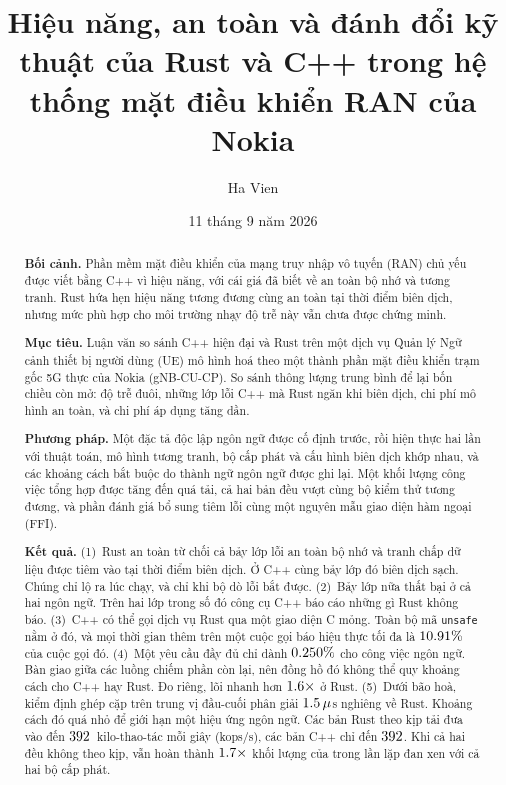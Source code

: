 \documentclass[english,oneside,a4paper,censored,csm,software-track-2020]{HYthesisML}
\title{Hiệu năng, an toàn và đánh đổi kỹ thuật của Rust và C++ trong hệ thống mặt điều khiển RAN của Nokia}
\author{Ha Vien}
\date{11 tháng 9 năm 2026}
\begin{document}
\maketitle

{\singlespacing
\begin{otherlanguage}{english}
\begin{abstract}
      \noindent\textbf{Bối cảnh.}
      Phần mềm mặt điều khiển của mạng truy nhập vô tuyến (RAN) chủ yếu được viết bằng C++ vì hiệu
      năng, với cái giá đã biết về an toàn bộ nhớ và tương tranh. Rust hứa hẹn hiệu năng tương đương
      cùng an toàn tại thời điểm biên dịch, nhưng mức phù hợp cho môi trường nhạy độ trễ này vẫn chưa
      được chứng minh.

      \noindent\textbf{Mục tiêu.}
      Luận văn so sánh C++ hiện đại và Rust trên một dịch vụ Quản lý Ngữ cảnh thiết bị người dùng (UE)
      mô hình hoá theo một thành phần mặt điều khiển trạm gốc 5G thực của Nokia (gNB-CU-CP).
      So sánh thông lượng trung bình để lại bốn chiều còn mở: độ trễ đuôi, những lớp lỗi C++ mà Rust
      ngăn khi biên dịch, chi phí mô hình an toàn, và chi phí áp dụng tăng dần.

      \noindent\textbf{Phương pháp.}
      Một đặc tả độc lập ngôn ngữ được cố định trước, rồi hiện thực hai lần với thuật toán, mô hình
      tương tranh, bộ cấp phát và cấu hình biên dịch khớp nhau, và các khoảng cách bắt buộc do thành
      ngữ ngôn ngữ được ghi lại. Một khối lượng công việc tổng hợp được tăng đến quá tải, cả hai bản
      đều vượt cùng bộ kiểm thử tương đương, và phần đánh giá bổ sung tiêm lỗi cùng một nguyên mẫu
      giao diện hàm ngoại (FFI).

      \noindent\textbf{Kết quả.}
      (1)~Rust an toàn từ chối cả bảy lớp lỗi an toàn bộ nhớ và tranh chấp dữ liệu được tiêm vào tại
      thời điểm biên dịch. Ở C++ cùng bảy lớp đó biên dịch sạch. Chúng chỉ lộ ra lúc chạy, và chỉ khi
      bộ dò lỗi bắt được. (2)~Bảy lớp nữa thất bại ở cả hai ngôn ngữ. Trên hai lớp trong số đó công cụ
      C++ báo cáo những gì Rust không báo. (3)~C++ có thể gọi dịch vụ Rust qua một giao diện C mỏng.
      Toàn bộ mã \texttt{unsafe} nằm ở đó, và mọi thời gian thêm trên một cuộc gọi báo hiệu thực tối đa
      là $10.91\%$ của cuộc gọi đó. (4)~Một yêu cầu đầy đủ chỉ dành $0.250\%$ cho
      công việc ngôn ngữ. Bàn giao giữa các luồng chiếm phần còn lại, nên đồng hồ đó không thể quy
      khoảng cách cho C++ hay Rust. Đo riêng, lõi nhanh hơn $1.6\times$ ở Rust.
      (5)~Dưới bão hoà, kiểm định ghép cặp trên trung vị đầu-cuối phân giải $1.5\,\mu$s
      nghiêng về Rust. Khoảng cách đó quá nhỏ để giới hạn một hiệu ứng ngôn ngữ. Các bản Rust theo kịp
      tải đưa vào đến $392$~kilo-thao-tác mỗi giây (kops/s), các bản C++ chỉ đến
      $392$. Khi cả hai đều không theo kịp, \OverloadSustainedFaster{} vẫn hoàn thành
      $1.7\times$ khối lượng của \OverloadSustainedSlower{} trong \OverloadThrAgree{}
      lần lặp đan xen với cả hai bộ cấp phát.


\end{abstract}
\end{otherlanguage}}
\end{document}
